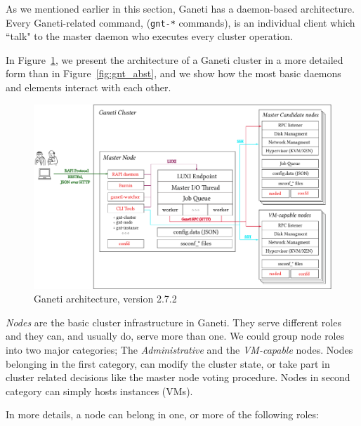 As we mentioned earlier in this section, Ganeti has a daemon-based architecture.
Every Ganeti-related command, (\texttt{gnt-*} commands), is an individual client
which ``talk" to the master daemon who executes every cluster operation.

In Figure~\ref{fig:gnt_arch}, we present the architecture of a Ganeti cluster in
a more detailed form than in Figure~\ref{fig:gnt_abst}, and we show how the most
basic daemons and elements interact with each other.

\begin{figure}[htbp]
  \begin{center}
    \includegraphics[width=1.0\maxwidth]{../figures/ganeti_arch_horizonal.pdf}
    \caption{Ganeti architecture, version 2.7.2\label{fig:gnt_arch}}
   \end{center}
\end{figure}

\emph{Nodes} are the basic cluster infrastructure in Ganeti. They serve
different roles and they can, and usually do, serve more than one. We could
group node roles into two major categories; The \emph{Administrative}
and the \emph{VM-capable} nodes. Nodes belonging in the first category, can
modify the cluster state, or take part in cluster related decisions like the
master node voting procedure. Nodes in second category can simply hosts
instances (VMs).

In more details, a node can belong in one, or more of the following roles:

